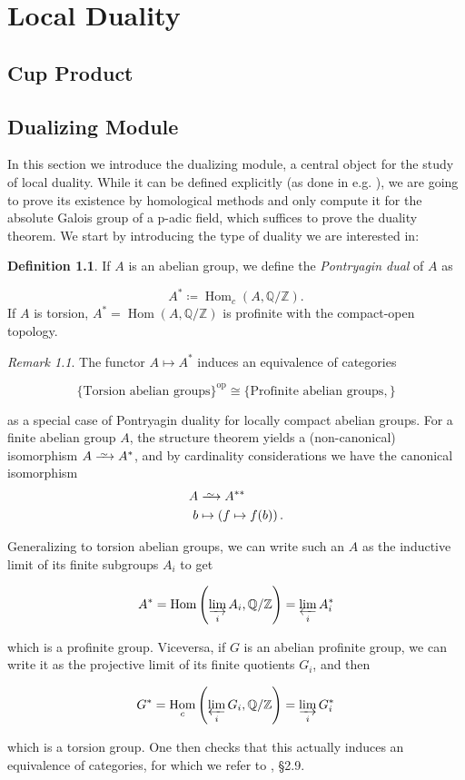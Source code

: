 \documentclass[a4paper, oneside]{memoir}
\def\Q{\mathbb{Q}}
\def\Z{\mathbb{Z}}
\DeclareMathOperator{\Hom}{Hom}
\newcommand\Iso{\xrightarrow{
   \,\smash{\raisebox{-0.65ex}{\ensuremath{\scriptstyle\sim}}}\,}}
\theoremstyle{plain}
\theoremstyle{definition}
\newtheorem{definition}[theorem]{Definition}
\theoremstyle{remark}
\newtheorem*{remark}{Remark}
\begin{document}
\chapter{Local Duality}

\section{Cup Product}

\section{Dualizing Module}

In this section we introduce the dualizing module, a central object for the study of local duality. While it can be defined explicitly (as done in e.g. \cite{Neukirch}),
we are going to prove its existence by homological methods and only compute it for the absolute Galois group of a p-adic field, which suffices to prove the duality theorem. We
start by introducing the type of duality we are interested in:

\begin{definition}
    If \(A\) is an abelian group, we define the \textit{Pontryagin dual} of \(A\) as

    \[
        A^*\coloneqq \Hom_{c}(A,\Q/\Z)
        .\]
    If \(A\) is torsion, \(A^*=\Hom(A,\Q/\Z)\) is profinite with the compact-open topology.
\end{definition}

\begin{remark}
    The functor \(A\mapsto A^*\)  induces an equivalence of categories

    \[
        \{ \text{Torsion abelian groups} \}^{\text{op}}  \cong \{ \text{Profinite abelian groups}, \}
    \]

    as a special case of Pontryagin duality for locally compact abelian groups.
    For a finite abelian group \(A\), the structure theorem yields a (non-canonical) isomorphism \(A\Iso A^*\), and by cardinality considerations we have the canonical isomorphism
    \begin{align*}
        A & \Iso A^{**}                           \\
        b & \mapsto \left( f\mapsto f(b) \right).
    \end{align*}

    Generalizing to torsion abelian groups, we can write such an \(A\) as the inductive limit of its finite subgroups \(A_i\) to get

    \[
        A^* = \Hom\left(\varinjlim_i A_i,\Q/\Z\right) = \varprojlim_i A_i^*
    \]

    which is a profinite group. Viceversa, if \(G\) is an abelian profinite group, we can write it as the projective limit of its finite quotients \(G_i\), and then

    \[
        G^* = \Hom_{c}\left( \varprojlim_i G_i,\Q/\Z \right) = \varinjlim_i G_i^*
    \]

    which is a torsion group. One then checks that this actually induces an equivalence of categories, for which we refer to \cite{RibesZalesskii}, \S 2.9.
\end{remark}
\end{document}
